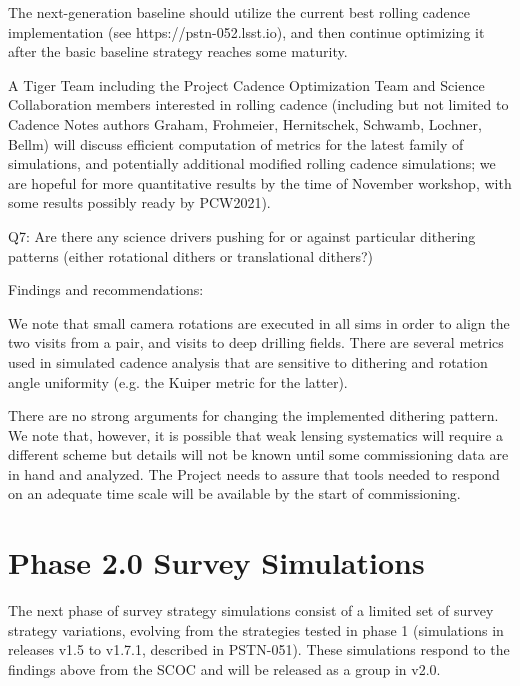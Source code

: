 The next-generation baseline should utilize the current best rolling cadence implementation (see https://pstn-052.lsst.io), and then continue optimizing it after the basic baseline strategy reaches some maturity. 

A Tiger Team including the Project Cadence Optimization Team and Science Collaboration 
members interested in rolling cadence (including but not limited to Cadence Notes authors Graham, Frohmeier, Hernitschek, Schwamb, Lochner, Bellm) will discuss efficient computation of metrics for the latest family of simulations, and potentially additional modified rolling cadence simulations; we are hopeful for more quantitative results by the time of November workshop, with some results possibly ready by PCW2021).  


Q7:  Are there any science drivers pushing for or against particular dithering patterns 
(either rotational dithers or translational dithers?)  

Findings and recommendations:

We note that small camera rotations are executed in all sims in order to align the two visits from a pair, and visits to deep drilling fields. There are several metrics used in simulated cadence analysis that are sensitive to dithering and rotation angle uniformity (e.g. the Kuiper metric for the latter). 

There are no strong arguments for changing the implemented dithering pattern. We note that, however, it is possible that weak lensing systematics will require a different scheme but details will not be known until some commissioning data are in hand and analyzed. The Project needs to assure that tools needed to respond on an adequate time scale will be available by the start of commissioning. 
 

\section{Phase 2.0 Survey Simulations}

The next phase of survey strategy simulations consist of a limited set of survey strategy variations, evolving from the strategies tested in phase 1 (simulations in releases v1.5 to v1.7.1, described in PSTN-051). These simulations respond to the findings above from the SCOC and will be released as a group in v2.0. 

